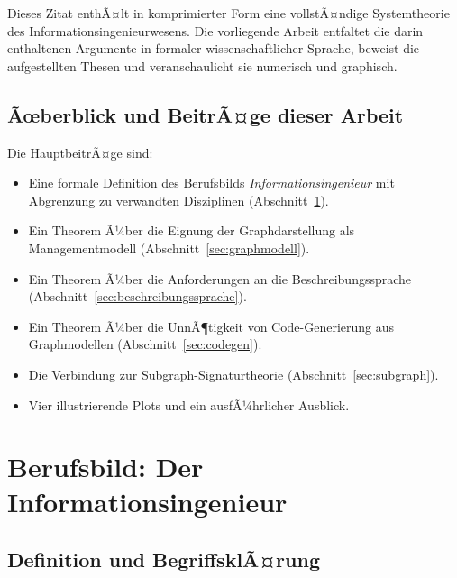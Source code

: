 ﻿\documentclass[a4paper,12pt]{article}
\theoremstyle{definition}
\begin{document}
\noindent
Dieses Zitat enthÃ¤lt in komprimierter Form eine vollstÃ¤ndige Systemtheorie des
Informationsingenieurwesens. Die vorliegende Arbeit entfaltet die darin enthaltenen
Argumente in formaler wissenschaftlicher Sprache, beweist die aufgestellten Thesen und
veranschaulicht sie numerisch und graphisch.

\subsection{Ãœberblick und BeitrÃ¤ge dieser Arbeit}

Die HauptbeitrÃ¤ge sind:

\begin{itemize}
  \item Eine formale Definition des Berufsbilds \emph{Informationsingenieur} mit
        Abgrenzung zu verwandten Disziplinen (Abschnitt~\ref{sec:berufsbild}).
  \item Ein Theorem Ã¼ber die Eignung der Graphdarstellung als Managementmodell
        (Abschnitt~\ref{sec:graphmodell}).
  \item Ein Theorem Ã¼ber die Anforderungen an die Beschreibungssprache
        (Abschnitt~\ref{sec:beschreibungssprache}).
  \item Ein Theorem Ã¼ber die UnnÃ¶tigkeit von Code-Generierung aus Graphmodellen
        (Abschnitt~\ref{sec:codegen}).
  \item Die Verbindung zur Subgraph-Signaturtheorie
        (Abschnitt~\ref{sec:subgraph}).
  \item Vier illustrierende Plots und ein ausfÃ¼hrlicher Ausblick.
\end{itemize}

\section{Berufsbild: Der Informationsingenieur}
\label{sec:berufsbild}

\subsection{Definition und BegriffsklÃ¤rung}
\end{document}
